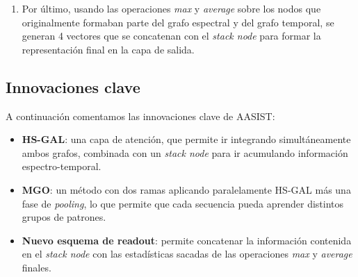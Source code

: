 \begin{enumerate}
\begin{itemize}
            \item Un \textit{stack node}, conectado de forma unidireccional a todos los nodos, que va acumulando la información espectro-temporal entre sucesivas capas HS-GAL.
            \item Tras cada HS-GAL, se aplica otra vez la técnica \textit{graph pooling} con el mismo objetivo anterior.
        \end{itemize}
    Sobre la combinación del punto 3 para establecer la conectividad entre grafos, el grafo heterogéneo se introduce en el bloque MGO (\textit{Max Graph Operation}), formado por dos ramas paralelas. En cada rama independiente se aplican consecutivamente dos capas HS-GAL, cada una seguida de una operación \textit{graph pooling}. En esta etapa es donde se realiza la verdadera integración entre ambos dominios para que los nodos heterogéneos aprendan cómo deben relacionarse entre sí.
    
    Dentro de cada rama, el \textit{stack node} se propaga de la primera HS-GAL a la segunda. Finalmente, se combinan las salidas de ambas ramas usando un máximo elemento a elemento, teniendo como resultado un grafo heterogéneo.
    \item Por último, usando las operaciones \textit{max} y \textit{average} sobre los nodos que originalmente formaban parte del grafo espectral y del grafo temporal, se generan 4 vectores que se concatenan con el \textit{stack node} para formar la representación final en la capa de salida.
\end{enumerate}

\subsection*{Innovaciones clave}

A continuación comentamos las innovaciones clave de AASIST:

\begin{itemize}
    \item \textbf{HS-GAL}: una capa de atención, que permite ir integrando simultáneamente ambos grafos, combinada con un \textit{stack node} para ir acumulando información espectro-temporal.
    \item \textbf{MGO}: un método con dos ramas aplicando paralelamente HS-GAL más una fase de \textit{pooling}, lo que permite que cada secuencia pueda aprender distintos grupos de patrones. 
    \item \textbf{Nuevo esquema de readout}: permite concatenar la información contenida en el \textit{stack node} con las estadísticas sacadas de las operaciones \textit{max} y \textit{average} finales.
\end{itemize}


